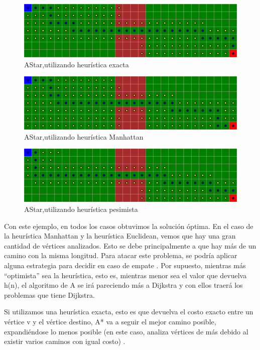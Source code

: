 \begin{figure}[H]
\centering
\includegraphics[width=\textwidth]{AStar/grafo1HeuristicaExacta.png}
\caption{AStar,utilizando heurística exacta}
\end{figure}

\begin{figure}[H]
\centering
\includegraphics[width=\textwidth]{AStar/grafo1HeuristicaManhattan.png}
\caption{AStar,utilizando heurística Manhattan}
\end{figure}

\begin{figure}[H]
\centering
\includegraphics[width=\textwidth]{AStar/grafo1HeuristicaPesimista.png}
\caption{AStar,utilizando heurística pesimista}
\end{figure}

Con este ejemplo, en todos los casos obtuvimos la solución óptima. 
En el caso de la heurística Manhattan y la heurística Euclidean, vemos que hay una gran cantidad
de vértices analizados. Esto se debe principalmente a que hay más de un camino con la misma longitud.
Para atacar este problema, se podría aplicar alguna estrategia para decidir en caso de empate \cite{HEURISTICAS}.
Por supuesto, mientras más ``optimista'' sea la heurística, esto es, mientras menor sea el valor que devuelva h(n), 
el algoritmo de A\* se irá pareciendo más a Dijkstra y con ellos traerá los problemas que tiene Dijkstra.


Si utilizamos una heurística exacta, 
esto es que devuelva el costo exacto entre un vértice v y el vértice destino, 
A* va a seguir el mejor camino posible, expandiéndose lo menos posible (en este caso, 
analiza vértices de más debido al existir varios caminos con igual costo) \cite{HEURISTICAS}.


